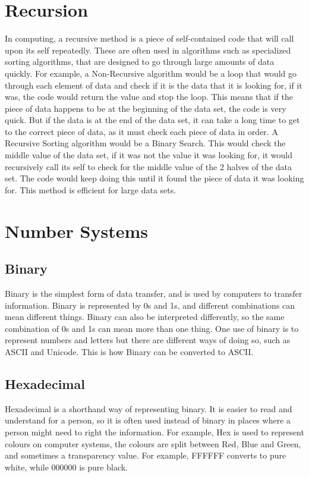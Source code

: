 \documentclass[a4paper,12pt]{article}
\begin{document}
\section{Recursion}
  In computing, a recursive method is a piece of self-contained code that will call upon its self repeatedly. These are often used in algorithms such as specialized sorting algorithms, that are designed to go through large amounts of data quickly. For example, a Non-Recursive algorithm would be a loop that would go through each element of data and check if it is the data that it is looking for, if it was, the code would return the value and stop the loop. This means that if the piece of data happens to be at the beginning of the data set, the code is very quick. But if the data is at the end of the data set, it can take a long time to get to the correct piece of data, as it must check each piece of data in order.
  A Recursive Sorting algorithm would be a Binary Search. This would check the middle value of the data set, if it was not the value it was looking for, it would recursively call its self to check for the middle value of the 2 halves of the data set. The code would keep doing this until it found the piece of data it was looking for. This method is efficient for large data sets.

\section{Number Systems}
  \subsection{Binary}
    Binary is the simplest form of data transfer, and is used by computers to transfer information. Binary is represented by 0s and 1s, and different combinations can mean different things. Binary can also be interpreted differently, so the same combination of 0s and 1s can mean more than one thing. One use of binary is to represent numbers and letters but there are different ways of doing so, such as ASCII and Unicode. This is how Binary can be converted to ASCII.

  \subsection{Hexadecimal}
    Hexadecimal is a shorthand way of representing binary. It is easier to read and understand for a person, so it is often used instead of binary in places where a person might need to right the information. For example, Hex is used to represent colours on computer systems, the colours are split between Red, Blue and Green, and sometimes a transparency value. For example, FFFFFF converts to pure white, while 000000 is pure black.
\end{document}

